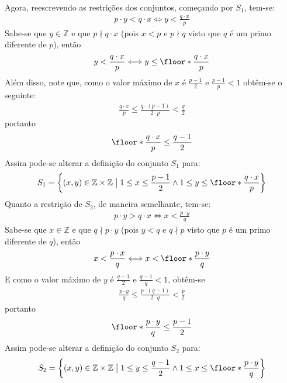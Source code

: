 Agora, reescrevendo as restrições dos conjuntos, começando por $S_1$, tem-se:
\begin{align*}
    p \cdot y < q \cdot x \Longleftrightarrow y < \frac{q \cdot x}{p}
\end{align*}
Sabe-se que $y \in \mathbb{Z}$ e que $p \nmid q \cdot x$ (pois $x < p$ e $p \nmid q$ visto que $q$ é um primo diferente de $p$), então
\begin{align*}
    y < \frac{q \cdot x}{p} \Longleftrightarrow y \leq \floor*{\frac{q \cdot x}{p}} 
\end{align*}
Além disso, note que, como o valor máximo de $x$ é $\frac{p-1}{2}$ e $\frac{p-1}{p} < 1$ obtêm-se o seguinte:
\begin{align*}
    \frac{q \cdot x}{p} \leq \frac{q \cdot (p-1)}{2 \cdot p} < \frac{q}{2}
\end{align*}
portanto
\begin{align*}
    \floor*{\frac{q \cdot x}{p}} \leq \frac{q-1}{2} 
\end{align*}
Assim pode-se alterar a definição do conjunto $S_1$ para:
\begin{align*}
    S_1 = \left\{ (x, y) \in \mathbb{Z} \times \mathbb{Z} \;\big|\; 1 \leq x \leq \frac{p-1}{2} \land 1 \leq y \leq \floor*{\frac{q \cdot x}{p}} \right\}
\end{align*}
Quanto a restrição de $S_2$, de maneira semelhante, tem-se:
\begin{align*}
    p \cdot y > q \cdot x \Longleftrightarrow x < \frac{p \cdot y}{q}
\end{align*}
Sabe-se que $x \in \mathbb{Z}$ e que $q \nmid p \cdot y$ (pois $y < q$ e $q \nmid p$ visto que $p$ é um primo diferente de $q$), então
\begin{align*}
    x < \frac{p \cdot x}{q} \Longleftrightarrow x < \floor*{\frac{p \cdot y}{q}} 
\end{align*}
E como o valor máximo de $y$ é $\frac{q-1}{2}$ e $\frac{q-1}{q} < 1$, obtêm-se
\begin{align*}
    \frac{p \cdot y}{q} \leq \frac{p \cdot (q - 1)}{2 \cdot q} < \frac{p}{2}
\end{align*}
portanto
\begin{align*}
    \floor*{\frac{p \cdot y}{q}} \leq \frac{p-1}{2} 
\end{align*}
Assim pode-se alterar a definição do conjunto $S_2$ para:
\begin{align*}
    S_2 = \left\{ (x, y) \in \mathbb{Z} \times \mathbb{Z} \;\big|\; 1 \leq y \leq \frac{q-1}{2} \land 1 \leq x \leq \floor*{\frac{p \cdot y}{q}} \right\}
\end{align*}
